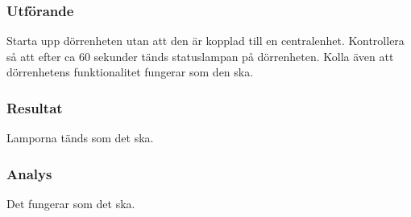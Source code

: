 \subsubsection*{Utförande}
Starta upp dörrenheten utan att den är kopplad till en centralenhet.
Kontrollera så att efter ca 60 sekunder tänds statuslampan
på dörrenheten. Kolla även att dörrenhetens funktionalitet 
fungerar som den ska. 


\subsubsection*{Resultat}
Lamporna tänds som det ska.



\subsubsection*{Analys}
Det fungerar som det ska.


